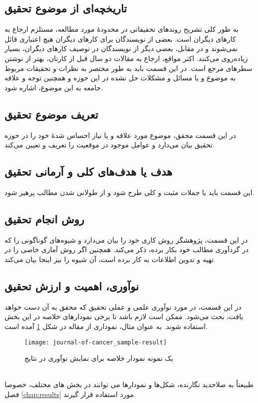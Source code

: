 \subsection{تاریخچه‌ای از موضوع تحقیق}
به طور کلی تشریح روندهای تحقیقاتی در محدودهٔ مورد مطالعه، مستلزم ارجاع به کارهای دیگران است. بعضی از نویسندگان برای کارهای دیگران هیچ اعتباری قائل نمی‌شوند و در مقابل، بعضی دیگر از نویسندگان در توصیف کارهای دیگران، بسیار زیاده‌روی می‌کنند. اکثر مواقع، ارجاع به مقالات دو سال قبل از کارتان، بهتر از نوشتن سطرهای مرجع است. در این قسمت باید به طور مختصر به نظرات و تحقیقات مربوط به موضوع و یا مسائل و مشکلات حل نشده در این حوزه و همچنین توجه و علاقه جامعه به این موضوع، اشاره شود.

\subsection{تعریف موضوع تحقیق}
در این قسمت محقق، موضوع مورد علاقه و یا نیاز احساس شدهٔ خود را در حوزه تحقیق بیان می‌دارد و عوامل موجود در موقعیت را تعریف و تعیین می‌کند.

\subsection{هدف یا هدف‌های کلی و آرمانی تحقیق}
این قسمت باید با جملات مثبت و کلی طرح شود و از طولانی شدن مطالب پرهیز شود.

\subsection{روش انجام تحقیق}
در این قسمت، پژوهشگر روش کاری خود را بیان می‌دارد و شیوه‌های گوناگونی را که در گردآوری مطالب خود بکار برده، ذکر می‌کند. همچنین اگر روش آماری خاصی را در تهیه و تدوین اطلاعات به کار برده است، آن شیوه را نیز اینجا بیان می‌کند.

\subsection{نوآوری، اهمیت و ارزش تحقیق}
در این قسمت، در مورد نوآوری علمی و عملی تحقیق که محقق به آن دست خواهد یافت، بحث می‌شود. ممکن است لازم باشد تا برخی نمودارهای خلاصه در این بخش استفاده شوند. به عنوان مثال، نموداری از مقاله
\cite{kim2016integrated}
در شکل
\ref{fig:sampleDiagram}
آمده است.
\begin{figure}[ht]
	\centerline{\texttt{[image: journal-of-cancer\_sample-result]}}
	\caption{یک نمونه نمودار خلاصه برای نمایش نوآوری در نتایج
	}
	\label{fig:sampleDiagram}
\end{figure}\\
طبیعتاً به صلاحدید نگارنده، شکل‌ها و نمودار‌ها می توانند در بخش های مختلف، خصوصا فصل
\ref{chap:results}
مورد استفاده قرار گیرند.

